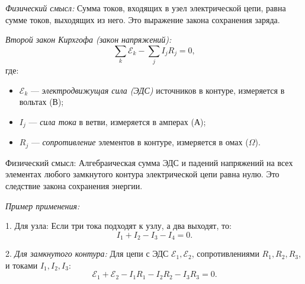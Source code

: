 \textit{Физический смысл:}  
Сумма токов, входящих в узел электрической цепи, равна сумме токов, выходящих из него. Это выражение закона сохранения заряда.

\textit{Второй закон Кирхгофа (закон напряжений):}
\[
\sum_{k} \mathcal{E}_k - \sum_{j} I_j R_j = 0,
\]
где:  
\begin{itemize}
    \item \( \mathcal{E}_k \) — \textit{электродвижущая сила (ЭДС)} источников в контуре, измеряется в вольтах (\( \text{В} \));
    \item \( I_j \) — \textit{сила тока} в ветви, измеряется в амперах (\( \text{А} \));
    \item \( R_j \) — \textit{сопротивление} элементов в контуре, измеряется в омах (\( \Omega \)).
\end{itemize}

Физический смысл:  
Алгебраическая сумма ЭДС и падений напряжений на всех элементах любого замкнутого контура электрической цепи равна нулю. Это следствие закона сохранения энергии.



\textit{Пример применения:}


\newpage

1. Для узла:  
Если три тока подходят к узлу, а два выходят, то:
\[
I_1 + I_2 - I_3 - I_4 = 0.
\]

2. \textit{Для замкнутого контура:}  
Для цепи с ЭДС \( \mathcal{E}_1, \mathcal{E}_2  \), сопротивлениями \( R_1, R_2, R_3 \), и токами \( I_1, I_2, I_3 \):
\[
\mathcal{E}_1+\mathcal{E}_2 - I_1 R_1 - I_2 R_2-I_3 R_3 = 0.
\]


